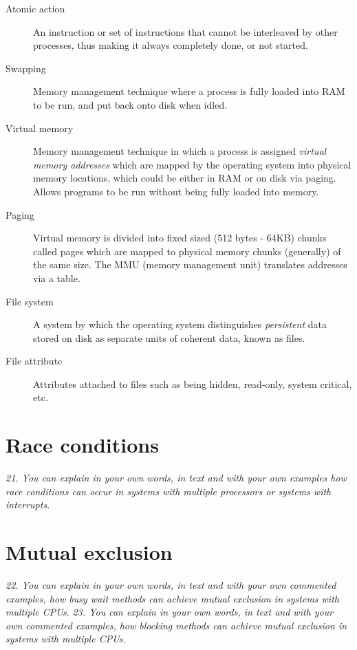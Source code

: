 \documentclass{article}
\begin{document}
\begin{description}
\item[Atomic action]
  An instruction or set of instructions that cannot be interleaved by other processes, thus making it always completely done, or not started.

\item[Swapping]
  Memory management technique where a process is fully loaded into RAM to be run, and put back onto disk when idled.

\item[Virtual memory]
  Memory management technique in which a process is assigned \emph{virtual memory addresses} which are mapped by the operating system into physical memory locations, which could be either in RAM or on disk via paging. Allows programs to be run without being fully loaded into memory.

\item[Paging]
  Virtual memory is divided into fixed sized (512 bytes - 64KB) chunks called pages which are mapped to physical memory chunks (generally) of the same size. The MMU (memory management unit) translates addresses via a table.

\item[File system]
  A system by which the operating system distinguishes \emph{persistent} data stored on disk as separate units of coherent data, known as files.

\item[File attribute]
  Attributes attached to files such as being hidden, read-only, system critical, etc.

\end{description}


\section{Race conditions}
\emph{21. You can explain in your own words, in text and with your own examples how race conditions can occur in systems with multiple processors or systems with interrupts.}



\section{Mutual exclusion}
\emph{22. You can explain in your own words, in text and with your own commented examples, how busy wait methods can achieve mutual exclusion in systems with multiple CPUs.}
\emph{23. You can explain in your own words, in text and with your own commented examples, how blocking methods can achieve mutual exclusion in systems with multiple CPUs.}

\end{document}

